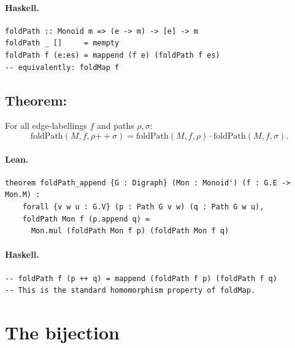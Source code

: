 \documentclass[11pt,a4paper]{article}
\begin{document}
\paragraph{Haskell.}
\begin{lstlisting}[style=haskell]
foldPath :: Monoid m => (e -> m) -> [e] -> m
foldPath _ []     = mempty
foldPath f (e:es) = mappend (f e) (foldPath f es)
-- equivalently: foldMap f
\end{lstlisting}


\subsection{Theorem: }

\begin{thm}
For all edge-labellings $f$ and paths $\rho, \sigma$:
\[
  \mathrm{foldPath}(M, f, \rho \mathbin{+\!\!+} \sigma) =
  \mathrm{foldPath}(M, f, \rho) \cdot \mathrm{foldPath}(M, f, \sigma).
\]
\end{thm}

\paragraph{Lean.}
\begin{lstlisting}[style=lean]
theorem foldPath_append {G : Digraph} (Mon : Monoid') (f : G.E -> Mon.M) :
    forall {v w u : G.V} (p : Path G v w) (q : Path G w u),
    foldPath Mon f (p.append q) =
      Mon.mul (foldPath Mon f p) (foldPath Mon f q)
\end{lstlisting}

\paragraph{Haskell.}
\begin{lstlisting}[style=haskell]
-- foldPath f (p ++ q) = mappend (foldPath f p) (foldPath f q)
-- This is the standard homomorphism property of foldMap.
\end{lstlisting}


\section{The bijection}

\end{document}
